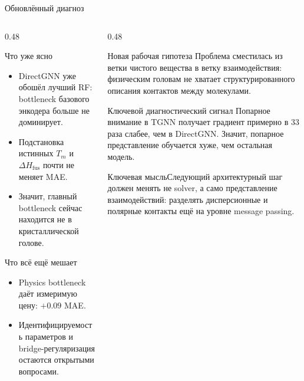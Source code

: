 \documentclass[aspectratio=169,10pt]{beamer}
\newcommand{\keybox}[1]{\begin{block}{Ключевая мысль}#1\end{block}}
\newcommand{\tightitems}{\setlength{\itemsep}{0.25em}}
\begin{document}
\begin{frame}{Обновлённый диагноз}
  \small
  \begin{columns}[T,onlytextwidth]
    \begin{column}{0.48\textwidth}
      \begin{block}{Что уже ясно}
        \scriptsize
        \begin{itemize}\tightitems
          \item DirectGNN уже обошёл лучший RF: bottleneck базового энкодера больше не доминирует.
          \item Подстановка истинных $T_m$ и $\Delta H_{\mathrm{fus}}$ почти не меняет MAE.
          \item Значит, главный bottleneck сейчас находится не в кристаллической голове.
        \end{itemize}
      \end{block}
      \begin{block}{Что всё ещё мешает}
        \scriptsize
        \begin{itemize}\tightitems
          \item Physics bottleneck даёт измеримую цену: $+0.09$ MAE.
          \item Идентифицируемость параметров и bridge-регуляризация остаются открытыми вопросами.
        \end{itemize}
      \end{block}
    \end{column}
    \begin{column}{0.48\textwidth}
      \begin{block}{Новая рабочая гипотеза}
        \scriptsize
        Проблема сместилась из ветки чистого вещества в ветку
        взаимодействия: физическим головам не хватает
        структурированного описания контактов между молекулами.
      \end{block}
      \begin{block}{Ключевой диагностический сигнал}
        \scriptsize
        Попарное внимание в TGNN получает градиент примерно
        в 33 раза слабее, чем в DirectGNN. Значит, попарное
        представление обучается хуже, чем остальная модель.
      \end{block}
      \keybox{\scriptsize Следующий архитектурный шаг должен менять не solver, а само представление взаимодействий: разделять дисперсионные и полярные контакты ещё на уровне message passing.}
    \end{column}
  \end{columns}
\end{frame}
\end{document}
